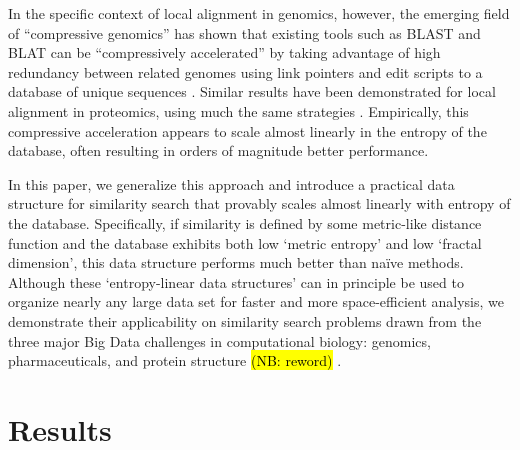 \documentclass[review,preprint,12pt]{elsarticle}
\renewcommand{\cite}{\citep} %
\theoremstyle{definition}
\theoremstyle{remark}
\numberwithin{equation}{section}
\begin{document}
In the specific context of local alignment in genomics, however, the emerging field of ``compressive genomics'' has shown that existing tools such as BLAST and BLAT can be ``compressively accelerated'' by taking advantage of high redundancy between related genomes using link pointers and edit scripts to a database of unique sequences \cite{loh2012compressive}.
Similar results have been demonstrated for local alignment in proteomics, using much the same strategies \cite{daniels2013compressive}.
Empirically, this compressive acceleration appears to scale almost linearly in the entropy of the database, often resulting in orders of magnitude better performance.

In this paper, we generalize this approach and introduce a practical data structure for similarity search that provably scales almost linearly with entropy of the database.
Specifically, if similarity is defined by some metric-like distance function and the database exhibits both low `metric entropy' and low `fractal dimension', this data structure performs much better than na\"ive methods.
Although these `entropy-linear data structures' can in principle be used to organize nearly any large data set for faster and more space-efficient analysis,
we demonstrate their applicability on similarity search problems drawn from the three major Big Data challenges in computational biology: genomics, pharmaceuticals, and protein structure \hl{(NB: reword)} \cite{marx2013biology}.

\section{Results}
\end{document}
